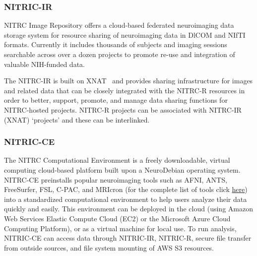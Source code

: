 \subsubsection{NITRIC-IR}

NITRC Image Repository offers a cloud-based federated neuroimaging data storage system for resource sharing of neuroimaging data in DlCOM and NIfTI formats. Currently it includes thousands of subjects and imaging sessions searchable across over a dozen projects to promote re-use and integration of valuable NIH-funded data.

The NITRC-IR is built on XNAT~\cite{marcus2007extensible} and provides sharing infrastructure for images and related data that can be closely integrated with the NITRC-R resources in order to better, support, promote, and manage data sharing functions for NITRC-hosted projects.
NITRC-R projects can be associated with NITRC-IR (XNAT) ‘projects’ and these can be interlinked. 


\subsubsection{NITRIC-CE}

The NITRC Computational Environment is a freely downloadable, virtual computing cloud-based platform built upon a NeuroDebian operating system. NITRC-CE preinstalls popular neuroimaging tools such as AFNI, ANTS, FreeSurfer, FSL, C-PAC, and MRIcron (for the complete list of tools click \href{https://www.nitrc.org/plugins/mwiki/index.php/nitrc:User_Guide_-_NITRC-CE_Installed_Packages}{here}) into a standardized computational environment to help users analyze their data quickly and easily. This environment can be deployed in the cloud (using Amazon Web Services Elastic Compute Cloud (EC2) or the Microsoft Azure Cloud Computing Platform), or as a virtual machine for local use. To run analysis, NITRIC-CE can access data through NITRIC-IR, NITRIC-R, secure ﬁle transfer from outside sources, and ﬁle system mounting of AWS S3 resources.



